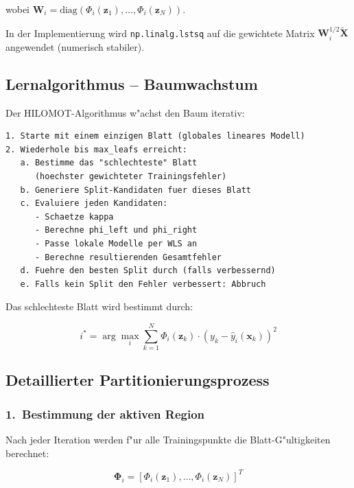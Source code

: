 \documentclass[12pt,a4paper]{article}
\begin{document}
wobei $\mathbf{W}_i = \mathrm{diag}(\Phi_i(\mathbf{z}_1), \ldots, \Phi_i(\mathbf{z}_N))$.

In der Implementierung wird \texttt{np.linalg.lstsq} auf die gewichtete Matrix $\mathbf{W}_i^{1/2} \tilde{\mathbf{X}}$ angewendet (numerisch stabiler).

\subsection{Lernalgorithmus -- Baumwachstum}

Der HILOMOT-Algorithmus w"achst den Baum iterativ:

\begin{lstlisting}[caption={HILOMOT-Lernalgorithmus (Pseudocode)},language={}
]
1. Starte mit einem einzigen Blatt (globales lineares Modell)
2. Wiederhole bis max_leafs erreicht:
   a. Bestimme das "schlechteste" Blatt
      (hoechster gewichteter Trainingsfehler)
   b. Generiere Split-Kandidaten fuer dieses Blatt
   c. Evaluiere jeden Kandidaten:
      - Schaetze kappa
      - Berechne phi_left und phi_right
      - Passe lokale Modelle per WLS an
      - Berechne resultierenden Gesamtfehler
   d. Fuehre den besten Split durch (falls verbessernd)
   e. Falls kein Split den Fehler verbessert: Abbruch
\end{lstlisting}

Das schlechteste Blatt wird bestimmt durch:

\begin{equation}
  i^* = \arg\max_i \sum_{k=1}^{N} \Phi_i(\mathbf{z}_k) \cdot \left(y_k - \hat{y}_i(\mathbf{x}_k)\right)^2
\end{equation}

\subsection{Detaillierter Partitionierungsprozess}

\subsubsection*{1.~Bestimmung der aktiven Region}

Nach jeder Iteration werden f"ur alle Trainingspunkte die Blatt-G"ultigkeiten berechnet:

\begin{equation}
  \boldsymbol{\Phi}_i = [\Phi_i(\mathbf{z}_1), \ldots, \Phi_i(\mathbf{z}_N)]^T
\end{equation}
\end{document}
